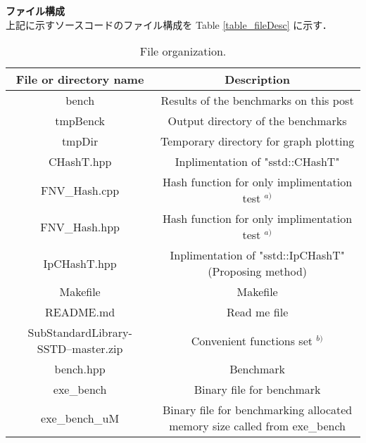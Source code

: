 {\bf ファイル構成}
\samepage \\ \indent
上記に示すソースコードのファイル構成を Table \ref{table_fileDesc} に示す．
\begin{table}[h]
  \begin{center}
    \fontsize{7pt}{10pt}\selectfont
    \caption{
      File organization.
    }
    \begin{tabular}{cc} \hline
      File or directory name     & Description                                                           \rule[0pt]{0pt}{8pt} \\ \hline
      bench                      & Results of the benchmarks on this post                                \\
      tmpBenck                   & Output directory of the benchmarks                                    \\
      tmpDir                     & Temporary directory for graph plotting                                \\
      CHashT.hpp                 & Inplimentation of "sstd::CHashT"                                      \\
      FNV\_Hash.cpp              & Hash function for only implimentation test $^{a)}$                     \\
      FNV\_Hash.hpp              & Hash function for only implimentation test $^{a)}$                     \\
      IpCHashT.hpp               & Inplimentation of "sstd::IpCHashT" (Proposing method)                 \\
      Makefile                   & Makefile                                                              \\
      README.md                  & Read me file                                                          \\
      SubStandardLibrary-SSTD--master.zip & Convenient functions set $^{b)}$                              \\
      bench.hpp                  & Benchmark                                                             \\
      exe\_bench                 & Binary file for benchmark                                             \\
      exe\_bench\_uM             & Binary file for benchmarking allocated memory size called from exe\_bench \\

\end{tabular}
\end{center}
\end{table}
